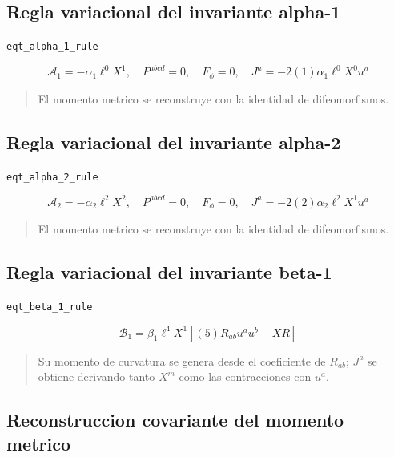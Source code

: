 \documentclass[11pt,a4paper]{article}
\begin{document}
\subsection{Regla variacional del invariante alpha-1}

\noindent\texttt{eqt\_alpha\_1\_rule}\par\nopagebreak[4]

\[
\mathcal A_{1} = -\alpha_{1}\ell^{0}X^{1},\quad P^{abcd}=0,\quad F_\phi=0,\quad J^a=-2(1)\alpha_{1}\ell^{0}X^{0}u^a
\]

\begin{quote}\small El momento metrico se reconstruye con la identidad de difeomorfismos.\end{quote}

\subsection{Regla variacional del invariante alpha-2}

\noindent\texttt{eqt\_alpha\_2\_rule}\par\nopagebreak[4]

\[
\mathcal A_{2} = -\alpha_{2}\ell^{2}X^{2},\quad P^{abcd}=0,\quad F_\phi=0,\quad J^a=-2(2)\alpha_{2}\ell^{2}X^{1}u^a
\]

\begin{quote}\small El momento metrico se reconstruye con la identidad de difeomorfismos.\end{quote}

\subsection{Regla variacional del invariante beta-1}

\noindent\texttt{eqt\_beta\_1\_rule}\par\nopagebreak[4]

\[
\mathcal B_{1} = \beta_{1}\ell^{4}X^{1}\left[(5)R_{ab}u^au^b-XR\right]
\]

\begin{quote}\small Su momento de curvatura se genera desde el coeficiente de $R_{ab}$; $J^a$ se obtiene derivando tanto $X^m$ como las contracciones con $u^a$.\end{quote}

\subsection{Reconstruccion covariante del momento metrico}
\end{document}
